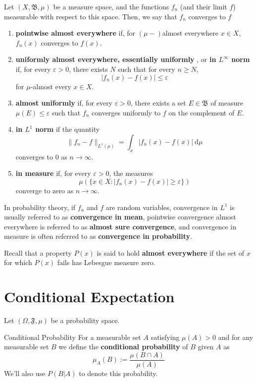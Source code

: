Let $(X, \mathfrak{B}, \mu)$ be a measure space, and the functions $f_n$ (and their limit $f$) measurable with respect to this space. Then, we say that $f_n$ converges to $f$
\begin{enumerate}
	\item \textbf{pointwise almost everywhere} if, for $(\mu-)$almost everywhere $x \in X$, $f_n(x)$ converges to $f(x)$.
	\item \textbf{uniformly almost everywhere, essentially uniformly} , or \textbf{in $L^\infty$ norm} if, for every $\varepsilon > 0$, there exists $N$ such that for every $n \geq N$, \[ |f_n(x) - f(x)| \leq \varepsilon \] for $\mu$-almost every $x \in X$.
	\item \textbf{almost uniformly} if, for every $\varepsilon > 0$, there exists a set $E \in \mathfrak{B}$ of measure $\mu(E) \leq \varepsilon$ such that $f_n$ converges uniformly to $f$ on the complement of $E$.
	\item \textbf{in $L^1$ norm} if the quantity \[ \| f_n - f \|_{L^1(\mu)} = \int_x |f_n(x) - f(x)| ~\mathrm{d}\mu \] converges to $0$ as $n \to \infty$.
	\item \textbf{in measure} if, for every $\varepsilon > 0$, the measures \[ \mu (\{ x \in X : | f_n(x) - f(x) | \geq \varepsilon \}) \] converge to zero as $n \to \infty$.
\end{enumerate}

In probability theory, if $f_n$ and $f$ are random variables, convergence in $L^1$ is usually referred to as \textbf{convergence in mean}, pointwise convergence almost everywhere is referred to as \textbf{almost sure convergence}, and convergence in measure is often referred to as \textbf{convergence in probability}.

Recall that a property $P(x)$ is said to hold \textbf{almost everywhere} if the set of $x$ for which $P(x)$ fails has Lebesgue measure zero.

\section{Conditional Expectation}

Let $(\Omega, \mathfrak{F}, \mu)$ be a probability space.

\begin{definition}[]{Conditional Probability}
For a measurable set $A$ satisfying $\mu(A) > 0$ and for any measurable set $B$ we define the \textbf{conditional probability} of $B$ given $A$ as
\[
	\mu_A(B) := \frac{\mu(B \cap A)}{\mu(A)} 
\]
We'll also use $P(B | A)$ to denote this probability.
\end{definition}

